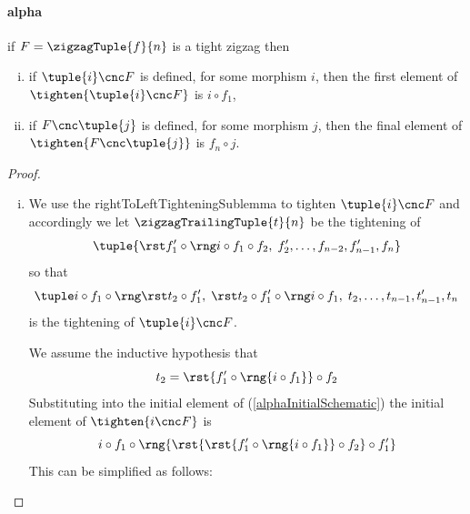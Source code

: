 \paragraph*{alpha}
\begin{lemma}
if $F=\zigzagTuple{f}{n}$ is a tight zigzag then
\begin{enumerate}[(i)]
\item if $\tuple{i} \cnc F$ is defined, 
for some morphism $i$, 
then the first element of $\tighten{\tuple{i} \cnc F}$ 
is $i \circ f_1$, 
\item if $F \cnc \tuple{j}$ is defined, 
for some morphism $j$, 
then the final element of $\tighten{F \cnc \tuple{j}}$ 
is $f_n \circ j$. 
\end{enumerate}
\end{lemma}
\begin{proof}
~
\begin{enumerate}[(i)]
\item %
We use the rightToLeftTighteningSublemma to tighten 
$\tuple{i} \cnc F$ and accordingly 
we let $\zigzagTrailingTuple{t}{n}$
be the tightening of
\[
\tuple{\tightTail[i]}
\]
so that 
\begin{equation}
\label{alphaInitialSchematic}
\rightToLeftTightening[i]
\end{equation}
is the tightening of $\tuple{i}\cnc F$.

\newcommand{\inductivets}
{\rst{ f'_1 \circ \rng{i \circ f_1}}\circ f_2}

We assume the inductive hypothesis that
\[
t_2 =  \inductivets
\]
Substituting into the initial element of
(\ref{alphaInitialSchematic})
the initial element of $\tighten{i\cnc F}$
is
\[
i\circ f_1 \circ \rng{\rst{\inductivets}\circ f'_1}
\]
This can be simplified as follows:


\end{enumerate}
\end{proof}
